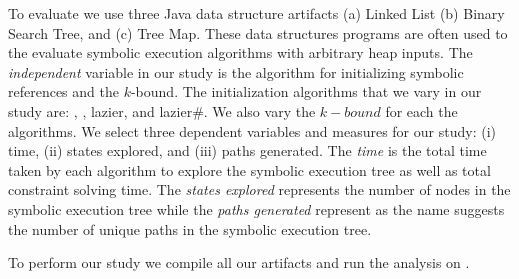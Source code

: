 To evaluate we use three Java data structure artifacts (a) Linked List
(b) Binary Search Tree, and (c) Tree Map. These data structures
programs are often used to the evaluate symbolic execution algorithms
with arbitrary heap inputs. The \emph{independent} variable in our
study is the algorithm for initializing symbolic references and the
$k$-bound. The initialization algorithms that we vary in our study
are: \symtxt{}, \gsetxt{}, lazier, and lazier\#. We also vary the
$k-bound$ for each the algorithms. We select three dependent variables
and measures for our study: (i) time, (ii) states explored, and (iii)
paths generated. The \emph{time} is the total time taken by each
algorithm to explore the symbolic execution tree as well as total
constraint solving time. The \emph{states explored} represents the
number of nodes in the symbolic execution tree while the \emph{paths
  generated} represent as the name suggests the number of unique paths
in the symbolic execution tree.

To perform our study we compile all our artifacts and run the analysis
on .


